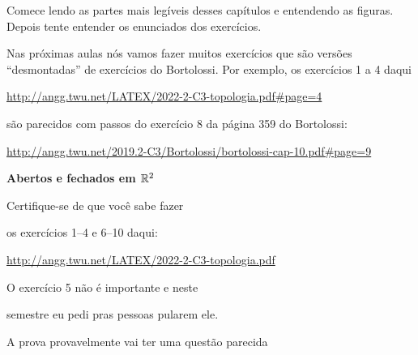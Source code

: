 \documentclass[oneside,12pt]{article}
\begin{document}
{{\msk

Comece lendo as partes mais legíveis desses capítulos e entendendo as
figu\-ras. Depois tente entender os enunciados dos exercícios.

\msk

Nas próximas aulas nós vamos fazer muitos exercícios que são versões
``desmontadas'' de exercícios do Bortolossi. Por exemplo, os
exercícios 1 a 4 daqui

\ssk

{\footnotesize

\url{http://angg.twu.net/LATEX/2022-2-C3-topologia.pdf\#page=4}

}

\ssk

são parecidos com passos do exercício 8 da página 359 do Bortolossi:

\ssk

{\footnotesize

\url{http://angg.twu.net/2019.2-C3/Bortolossi/bortolossi-cap-10.pdf\#page=9}

}


}\anothercol{
}}


\newpage


{\bf Abertos e fechados em $\mathbb{R}^2$}

Certifique-se de que você sabe fazer

os exercícios 1--4 e 6--10 daqui:


\ssk

{\footnotesize

\url{http://angg.twu.net/LATEX/2022-2-C3-topologia.pdf}

}

\msk

O exercício 5 não é importante e neste

semestre eu pedi pras pessoas pularem ele.

\bsk

A prova provavelmente vai ter uma questão parecida
\end{document}
